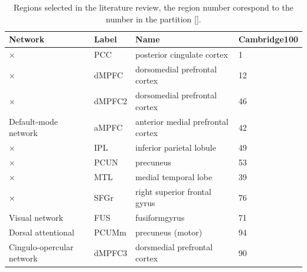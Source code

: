 \documentclass[authoryear]{elsarticle}
\begin{document}
\begin{table}[!ht]
\begin{center}
\begin{tabular}{l l l l}
\bfseries{Network} & \bfseries{Label} & \bfseries{Name} & \bfseries{Cambridge100}\\
\hline
× & PCC & posterior cingulate cortex & 1\\
× & dMPFC & dorsomedial prefrontal cortex & 12\\
× & dMPFC2 & dorsomedial prefrontal cortex & 46\\
Default-mode network & aMPFC & anterior medial prefrontal cortex & 42\\
× & IPL & inferior parietal lobule & 49\\
× & PCUN & precuneus & 53\\
× & MTL & medial temporal lobe & 39\\
× & SFGr & right superior frontal gyrus & 76\\
\hline
Visual network & FUS & fusiformgyrus & 71\\
\hline
Dorsal attentional & PCUMm & precuneus (motor) & 94\\
\hline
Cingulo-opercular network & dMPFC3 & dorsmedial prefrontal cortex & 90\\
\end{tabular}
\end{center}
\caption{Regions selected in the literature review, the region number corespond to the number in the partition \ref{}.}
\label{tab_point-to-point}
\end{table}
\end{document}

